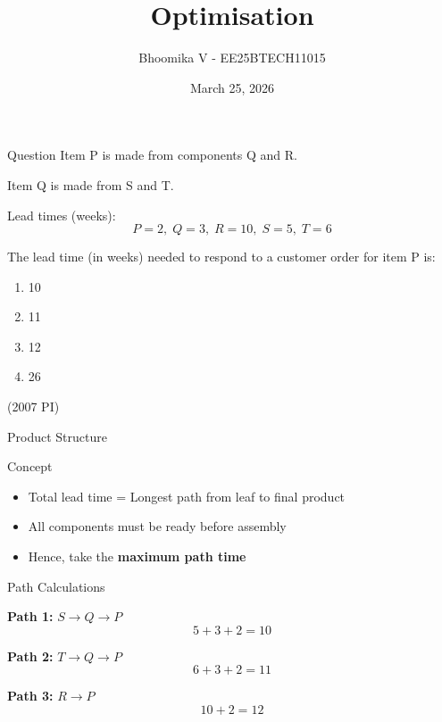 \documentclass{beamer}
\title{Optimisation}
\date{March 25, 2026}
\author 
{Bhoomika V - EE25BTECH11015}
\begin{document}
\frame{\titlepage}

\begin{frame}{Question}
Item P is made from components Q and R.  

Item Q is made from S and T.  

Lead times (weeks):
\[
P=2,\; Q=3,\; R=10,\; S=5,\; T=6
\]

The lead time (in weeks) needed to respond to a customer order for item P is:

\begin{enumerate}
\item[(a)] 10
\item[(b)] 11
\item[(c)] 12
\item[(d)] 26
\end{enumerate}

\hfill (2007 PI)
\end{frame}

\begin{frame}{Product Structure}

\centering
{}

\end{frame}

\begin{frame}{Concept}
\begin{itemize}
\item Total lead time = Longest path from leaf to final product
\item All components must be ready before assembly
\item Hence, take the \textbf{maximum path time}
\end{itemize}
\end{frame}

\begin{frame}{Path Calculations}

\textbf{Path 1: } $S \rightarrow Q \rightarrow P$
\[
5 + 3 + 2 = 10
\]

\vspace{0.3cm}

\textbf{Path 2: } $T \rightarrow Q \rightarrow P$
\[
6 + 3 + 2 = 11
\]

\vspace{0.3cm}

\textbf{Path 3: } $R \rightarrow P$
\[
10 + 2 = 12
\]

\end{frame}
\end{document}
